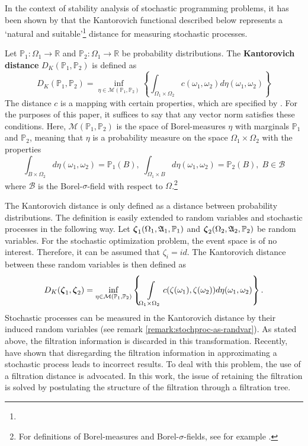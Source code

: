 In the context of stability analysis of stochastic programming problems, it has been shown by  that the Kantorovich functional described below
represents a  `natural and suitable'\footnote{} distance for measuring stochastic processes.
\begin{definition}
  Let $\mathbb{P}_1:\Omega_1\rightarrow\mathbb{R}$ and $\mathbb{P}_2:\Omega_1\rightarrow\mathbb{R}$ be probability distributions.
  The \textbf{Kantorovich distance} $D_K(\mathbb{P}_1,\mathbb{P}_2)$ is defined as
  \begin{equation}
    \label{eq:define-infinitedim-kantorovich}
    D_K(\mathbb{P}_1, \mathbb{P}_2) = \inf\limits_{\eta\in\mathcal{M}(\mathbb{P}_1,\mathbb{P}_2)}\left\{\int_{\Omega_1\times\Omega_2}c(\omega_1, \omega_2)d\eta(\omega_1,\omega_2)\right\}
  \end{equation}
  The distance $c$ is a mapping with certain properties, which are specified by .
  For the purposes of this paper, it suffices to say that any vector norm satisfies these conditions.
Here, $\mathcal{M}(\mathbb{P}_1, \mathbb{P}_2)$ is the space of Borel-measures $\eta$ with marginals $\mathbb{P}_1$ and $\mathbb{P}_2$, meaning that $\eta$ is a probability measure on the space $\Omega_1\times\Omega_2$ with the properties
\begin{equation}
  \label{eq:define-borel-measures}
  \int_{B\times \Omega_2} d\eta(\omega_1,\omega_2) = \mathbb{P}_1(B),\;   \int_{\Omega_1\times B} d\eta(\omega_1,\omega_2) = \mathbb{P}_2(B),\; B \in \mathcal{B}
\end{equation}
where $\mathcal{B}$ is the Borel-$\sigma$-field with respect to $\Omega$.\footnote{For definitions of Borel-measures and Borel-$\sigma$-fields, see for example .}
\end{definition}
The Kantorovich distance is only defined as a distance between probability distributions.
The definition is easily extended to random variables and stochastic processes in the following way.
Let $\boldsymbol\zeta_1(\Omega_1,\mathfrak{A}_1,\mathbb{P}_1)$ and $\boldsymbol\zeta_2(\Omega_2,\mathfrak{A}_2,\mathbb{P}_2)$ be random variables.
For the stochastic optimization problem, the event space is of no interest.
Therefore, it can be assumed that $\zeta_i = id$.
The Kantorovich distance between these random variables is then defined as
\begin{equation}
  \label{eq:64}
  D_K(\boldsymbol\zeta_1,\boldsymbol\zeta_2) = \inf\limits_{\eta\in\mathcal{M}(\mathbb{P}_1,\mathbb{P}_2)}\left\{\int\limits_{\Omega_1\times\Omega_2}c(\zeta(\omega_1),\zeta(\omega_2))d\eta(\omega_1,\omega_2)\right\}.
\end{equation}
Stochastic processes can be measured in the Kantorovich distance by their induced random variables (see remark \ref{remark:stochproc-as-randvar}).
As stated above, the filtration information is discarded in this transformation.
Recently,  have shown that disregarding the filtration information in approximating a stochastic process leads to incorrect results.
To deal with this problem, the use of a filtration distance is advocated.
In this work, the issue of retaining the filtration is solved by postulating the structure of the filtration through a filtration tree.
